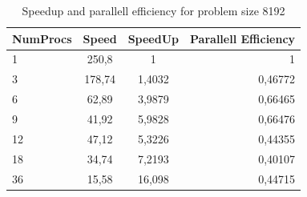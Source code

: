\begin{table}[ht]
  \centering
       \begin{tabular}{l | c | c | r}
        NumProcs & Speed & SpeedUp & Parallell Efficiency \\
        \hline
        1 & 250,8 & 1 & 1 \\
        3 & 178,74 & 1,4032 & 0,46772 \\
        6 & 62,89 & 3,9879 & 0,66465 \\
        9 & 41,92 & 5,9828 & 0,66476 \\
        12 & 47,12 & 5,3226 & 0,44355 \\
        18 & 34,74 & 7,2193 & 0,40107 \\
        36 & 15,58 & 16,098 & 0,44715 \\
        \hline
    \end{tabular}
\caption{Speedup and parallell efficiency for problem size 8192}
\end{table}
\FloatBarrier